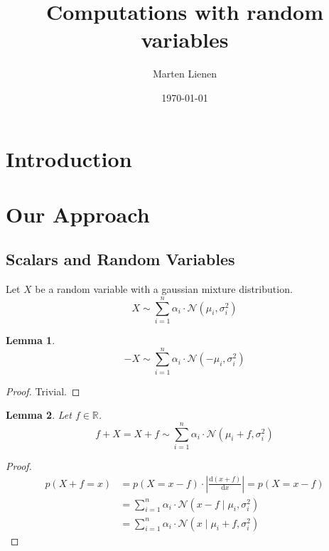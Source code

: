 \documentclass[11pt]{article}
\author{Marten Lienen}
\date{\today}
\title{Computations with random variables}
\newtheorem{lemma}{Lemma}
\begin{document}
\maketitle

\section{Introduction}

\section{Our Approach}

\subsection{Scalars and Random Variables}

Let $X$ be a random variable with a gaussian mixture distribution.
\begin{equation*}
  X \sim \sum_{i = 1}^{n} \alpha_{i} \cdot \mathcal{N}(\mu_{i}, \sigma_{i}^{2})
\end{equation*}

\begin{lemma}
  \begin{equation*}
    -X \sim \sum_{i = 1}^{n} \alpha_{i} \cdot \mathcal{N}(-\mu_{i}, \sigma_{i}^{2})
  \end{equation*}
\end{lemma}

\begin{proof}
  Trivial.
\end{proof}

\begin{lemma}
  Let $f \in \mathbb{R}$.
  \begin{equation*}
    f + X = X + f \sim \sum_{i = 1}^{n} \alpha_{i} \cdot \mathcal{N}(\mu_{i} + f, \sigma_{i}^{2})
  \end{equation*}
\end{lemma}

\begin{proof}
  \begin{align*}
    p(X + f = x) & = p(X = x - f) \cdot \left| \frac{\mathrm{d}(x + f)}{\mathrm{d}x} \right| = p(X = x - f)\\
                 & = \sum_{i = 1}^{n} \alpha_{i} \cdot \mathcal{N}(x - f \mid \mu_{i}, \sigma_{i}^{2})\\
                 & = \sum_{i = 1}^{n} \alpha_{i} \cdot \mathcal{N}(x \mid \mu_{i} + f, \sigma_{i}^{2})
  \end{align*}
\end{proof}
\end{document}
